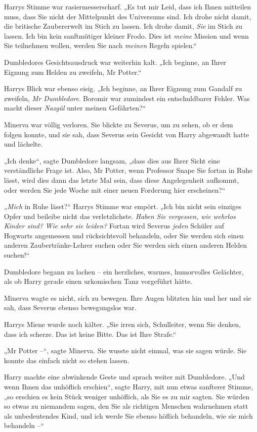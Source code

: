 {Harrys Stimme war rasiermesserscharf. „Es tut mir Leid, dass ich Ihnen mitteilen muss, dass Sie nicht der Mittelpunkt des Universums sind. Ich drohe nicht damit, die britische Zaubererwelt im Stich zu lassen. Ich drohe damit, \emph{Sie} im Stich zu lassen. Ich bin kein sanftmütiger kleiner Frodo. Dies ist \emph{meine} Mission und wenn Sie teilnehmen wollen, werden Sie nach \emph{meinen} Regeln spielen.“

Dumbledores Gesichtsausdruck war weiterhin kalt. „Ich beginne, an Ihrer Eignung zum Helden zu zweifeln, Mr Potter.“

Harrys Blick war ebenso eisig. „Ich beginne, an Ihrer Eignung zum Gandalf zu zweifeln, \emph{Mr Dumbledore}. Boromir war zumindest ein entschuldbarer Fehler. Was macht dieser \emph{Nazgûl} unter meinen Gefährten?“

Minerva war völlig verloren. Sie blickte zu Severus, um zu sehen, ob er dem folgen konnte, und sie sah, dass Severus sein Gesicht von Harry abgewandt hatte und lächelte.

„Ich denke“, sagte Dumbledore langsam, „dass dies aus Ihrer Sicht eine verständliche Frage ist. Also, Mr Potter, wenn Professor Snape Sie fortan in Ruhe lässt, wird dies dann das letzte Mal sein, dass diese Angelegenheit aufkommt, oder werden Sie jede Woche mit einer neuen Forderung hier erscheinen?“

„\emph{Mich} in Ruhe lässt?“ Harrys Stimme war empört. „Ich bin nicht sein einziges Opfer und beileibe nicht das verletzlichste. \emph{Haben Sie vergessen, wie wehrlos Kinder sind? Wie sehr sie leiden?} Fortan wird Severus \emph{jeden} Schüler auf Hogwarts angemessen und rücksichtsvoll behandeln, oder Sie werden sich einen anderen Zaubertränke-Lehrer suchen oder Sie werden sich einen anderen Helden suchen!“

Dumbledore begann zu lachen -- ein herzliches, warmes, humorvolles Gelächter, als ob Harry gerade einen urkomischen Tanz vorgeführt hätte.

Minerva wagte es nicht, sich zu bewegen. Ihre Augen blitzten hin und her und sie sah, dass Severus ebenso bewegungslos war.

Harrys Miene wurde noch kälter. „Sie irren sich, Schulleiter, wenn Sie denken, dass ich scherze. Das ist keine Bitte. Das ist Ihre Strafe.“

„Mr Potter --“, sagte Minerva. Sie wusste nicht einmal, was sie sagen würde. Sie konnte das einfach nicht so stehen lassen.

Harry machte eine abwinkende Geste und sprach weiter mit Dumbledore. „Und wenn Ihnen das unhöflich erschien“, sagte Harry, mit nun etwas sanfterer Stimme, „so erschien es kein Stück weniger unhöflich, als Sie es zu mir sagten. Sie würden so etwas zu niemandem sagen, den Sie als richtigen Menschen wahrnehmen statt als unbedeutendes Kind, und ich werde Sie ebenso höflich behandeln, wie sie mich behandeln --“

}
